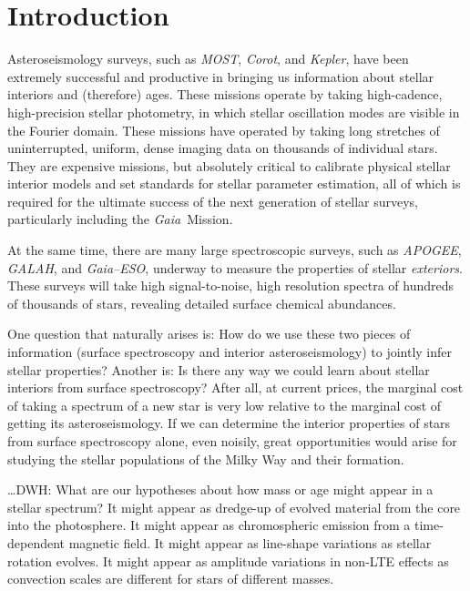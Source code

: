 \documentclass[12pt, preprint]{aastex}
\newcommand{\project}[1]{\textsl{#1}}
\newcommand{\apogee}{\project{APOGEE}}
\newcommand{\corot}{\project{Corot}}
\newcommand{\kepler}{\project{Kepler}}
\newcommand{\gaia}{\project{Gaia}}
\newcommand{\gaiaeso}{\project{Gaia--ESO}}
\newcommand{\galah}{\project{GALAH}}
\newcommand{\most}{\project{MOST}}
\begin{document}

\section{Introduction}\label{sec:Intro}

Asteroseismology surveys, such as \most, \corot, and \kepler, have
been extremely successful and productive in bringing us information
about stellar interiors and (therefore) ages.
These missions operate by taking high-cadence, high-precision stellar
photometry, in which stellar oscillation modes are visible in the
Fourier domain.
These missions have operated by taking long stretches of
uninterrupted, uniform, dense imaging data on thousands of individual
stars.
They are expensive missions, but absolutely critical to calibrate
physical stellar interior models and set standards for stellar
parameter estimation, all of which is required for the ultimate
success of the next generation of stellar surveys, particularly
including the \gaia\ Mission.

At the same time, there are many large spectroscopic surveys, such
as \apogee, \galah, and \gaiaeso, underway to measure the properties
of stellar \emph{exteriors}.
These surveys will take high signal-to-noise, high resolution spectra
of hundreds of thousands of stars, revealing detailed surface chemical
abundances.

One question that naturally arises is:
How do we use these two pieces of information (surface spectroscopy
and interior asteroseismology) to jointly infer stellar properties?
Another is:
Is there any way we could learn about stellar interiors from surface
spectroscopy?
After all, at current prices, the marginal cost of taking a spectrum of
a new star is very low relative to the marginal cost of getting its
asteroseismology.
If we can determine the interior properties of stars from surface
spectroscopy alone, even noisily, great opportunities would arise for
studying the stellar populations of the Milky Way and their formation.

\ldots DWH: What are our hypotheses about how mass or age might appear
in a stellar spectrum?  It might appear as dredge-up of evolved
material from the core into the photosphere.  It might appear as
chromospheric emission from a time-dependent magnetic field.  It might
appear as line-shape variations as stellar rotation evolves.  It might
appear as amplitude variations in non-LTE effects as convection scales
are different for stars of different masses.
\end{document}
